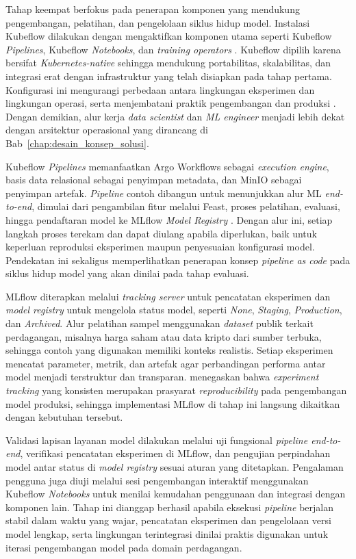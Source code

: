 Tahap keempat berfokus pada penerapan komponen yang mendukung pengembangan, pelatihan, dan pengelolaan siklus hidup model. Instalasi Kubeflow dilakukan dengan mengaktifkan komponen utama seperti Kubeflow \textit{Pipelines}, Kubeflow \textit{Notebooks}, dan \textit{training operators} \parencite{kubeflow2024}. Kubeflow dipilih karena bersifat \textit{Kubernetes-native} sehingga mendukung portabilitas, skalabilitas, dan integrasi erat dengan infrastruktur yang telah disiapkan pada tahap pertama. Konfigurasi ini mengurangi perbedaan antara lingkungan eksperimen dan lingkungan operasi, serta menjembatani praktik pengembangan dan produksi \parencite{kreuzberger2023mlops}. Dengan demikian, alur kerja \textit{data scientist} dan \textit{ML engineer} menjadi lebih dekat dengan arsitektur operasional yang dirancang di Bab~\ref{chap:desain_konsep_solusi}.

Kubeflow \textit{Pipelines} memanfaatkan Argo Workflows sebagai \textit{execution engine}, basis data relasional sebagai penyimpan metadata, dan MinIO sebagai penyimpan artefak. \textit{Pipeline} contoh dibangun untuk menunjukkan alur ML \textit{end-to-end}, dimulai dari pengambilan fitur melalui Feast, proses pelatihan, evaluasi, hingga pendaftaran model ke MLflow \textit{Model Registry} \parencite{mlflow2024}. Dengan alur ini, setiap langkah proses terekam dan dapat diulang apabila diperlukan, baik untuk keperluan reproduksi eksperimen maupun penyesuaian konfigurasi model. Pendekatan ini sekaligus memperlihatkan penerapan konsep \textit{pipeline as code} pada siklus hidup model yang akan dinilai pada tahap evaluasi.

MLflow diterapkan melalui \textit{tracking server} untuk pencatatan eksperimen dan \textit{model registry} untuk mengelola status model, seperti \textit{None}, \textit{Staging}, \textit{Production}, dan \textit{Archived}. Alur pelatihan sampel menggunakan \textit{dataset} publik terkait perdagangan, misalnya harga saham atau data kripto dari sumber terbuka, sehingga contoh yang digunakan memiliki konteks realistis. Setiap eksperimen mencatat parameter, metrik, dan artefak agar perbandingan performa antar model menjadi terstruktur dan transparan. \textcite{munappy2022data} menegaskan bahwa \textit{experiment tracking} yang konsisten merupakan prasyarat \textit{reproducibility} pada pengembangan model produksi, sehingga implementasi MLflow di tahap ini langsung dikaitkan dengan kebutuhan tersebut.

Validasi lapisan layanan model dilakukan melalui uji fungsional \textit{pipeline end-to-end}, verifikasi pencatatan eksperimen di MLflow, dan pengujian perpindahan model antar status di \textit{model registry} sesuai aturan yang ditetapkan. Pengalaman pengguna juga diuji melalui sesi pengembangan interaktif menggunakan Kubeflow \textit{Notebooks} untuk menilai kemudahan penggunaan dan integrasi dengan komponen lain. Tahap ini dianggap berhasil apabila eksekusi \textit{pipeline} berjalan stabil dalam waktu yang wajar, pencatatan eksperimen dan pengelolaan versi model lengkap, serta lingkungan terintegrasi dinilai praktis digunakan untuk iterasi pengembangan model pada domain perdagangan.

